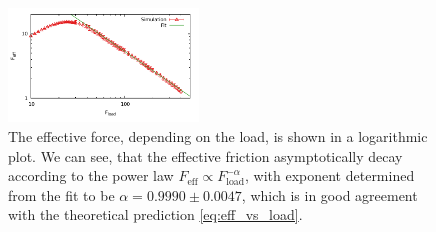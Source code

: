 \documentclass[aps,pre,twocolumn,showpacs,showkeys]{revtex4-1}
\begin{document}
\begin{figure}[t]
\centering
\includegraphics[width=0.45\textwidth,height=!]{eff_frict_decay}
\caption{The effective force, depending on the load, is shown in a logarithmic plot. 
We can see, that the effective friction asymptotically decay according to the power law $F_\text{eff} \propto F_\text{load}^{-\alpha}$, 
with exponent determined from the fit to be $\alpha = 0.9990 \pm 0.0047$, 
which is in good agreement with the theoretical prediction \eqref{eq:eff_vs_load}.
}
\label{Fig: eff_frict_decay}
\end{figure}
\end{document}
